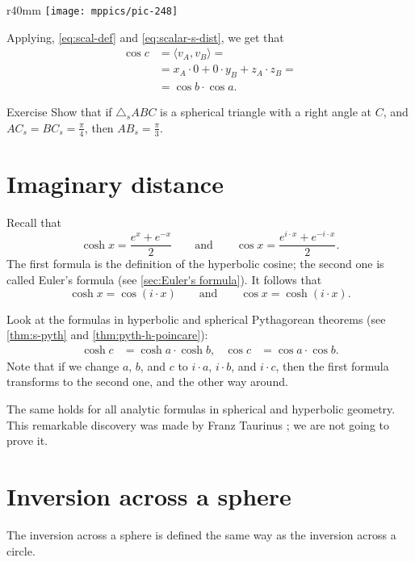 {

\begin{wrapfigure}{r}{40mm}
\centering
\texttt{[image: mppics/pic-248]}
\end{wrapfigure}

Applying, \ref{eq:scal-def} and \ref{eq:scalar-s-dist}, we get that
\begin{align*}
\cos c &=\langle v_A,v_B\rangle=
\\
&=x_A\cdot 0+0\cdot y_B+z_A\cdot z_B=
\\
&=\cos b\cdot\cos a.
\end{align*}
\qedsf

\begin{thm}{Exercise}\label{ex:2(pi/4)=pi/3}
Show that 
if $\triangle_sABC$ is a spherical triangle with a right angle at $C$,
and $AC_s=BC_s=\tfrac\pi4$, then $AB_s=\tfrac\pi3$.
\end{thm}

}

\section{Imaginary distance}

Recall that  
\[
\cosh x=\frac {e^{x}+e^{-x}}2
\qquad\text{and}\qquad
\cos x=\frac {e^{i\cdot x}+e^{-i\cdot x}}2.
\]
The first formula is the definition of the hyperbolic cosine;
the second one is called Euler's formula (see \ref{sec:Euler's formula}).
It follows that 
\[\cosh x=\cos (i\cdot x)
\qquad\text{and}\qquad
\cos x=\cosh (i\cdot x).\]

Look at the formulas in hyperbolic and spherical Pythagorean theorems (see \ref{thm:s-pyth} and \ref{thm:pyth-h-poincare}):
\begin{align*}
\cosh c&=\cosh a\cdot \cosh b,
&
\cos c&=\cos a\cdot \cos b.
\end{align*}
Note that if we change $a$, $b$, and $c$ to $i\cdot a$, $i\cdot b$, and $i\cdot c$,
then the first formula transforms to the second one, and the other way around.

The same holds for all analytic formulas in spherical and hyperbolic geometry.
This remarkable discovery was made by Franz Taurinus \cite{taurinus}; we are not going to prove it.

\section[Inversion]{Inversion across a sphere}

The inversion across a sphere is defined the same way as the inversion across a circle.

